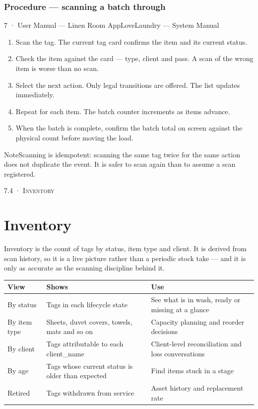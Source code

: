 \documentclass[11pt,a4paper,oneside]{book}
\begin{document}
\subsubsection*{Procedure — scanning a batch through}
7 · User Manual — Linen Room AppLoveLaundry — System Manual

\begin{enumerate}
\item Scan the tag. The current tag card confirms the item and its current status.
\item Check the item against the card — type, client and pass. A scan of the wrong item is worse than no scan.
\item Select the next action. Only legal transitions are offered. The list updates immediately.
\item Repeat for each item. The batch counter increments as items advance.
\item When the batch is complete, confirm the batch total on screen against the physical count before moving the load.
\end{enumerate}
\begin{notebox}NoteScanning is idempotent: scanning the same tag twice for the same action does not duplicate the event. It is safer to scan again than to assume a scan registered.\end{notebox}
\textsc{\small\color{crimson}7.4 · Inventory}\par\medskip
\section*{Inventory}
Inventory is the count of tags by status, item type and client. It is derived from scan history, so it is a live picture rather than a periodic stock take — and it is only as accurate as the scanning discipline behind it.

\begin{center}\small
\begin{tabularx}{\linewidth}{|X|X|X|}
\hline
\rowcolor{lightgrey}
\textbf{View} & \textbf{Shows} & \textbf{Use} \\ \hline
By status & Tags in each lifecycle state & See what is in wash, ready or missing at a glance \\ \hline
By item type & Sheets, duvet covers, towels, mats and so on & Capacity planning and reorder decisions \\ \hline
By client & Tags attributable to each client\_name & Client-level reconciliation and loss conversations \\ \hline
By age & Tags whose current status is older than expected & Find items stuck in a stage \\ \hline
Retired & Tags withdrawn from service & Asset history and replacement rate \\ \hline
\end{tabularx}
\end{center}
\end{document}
